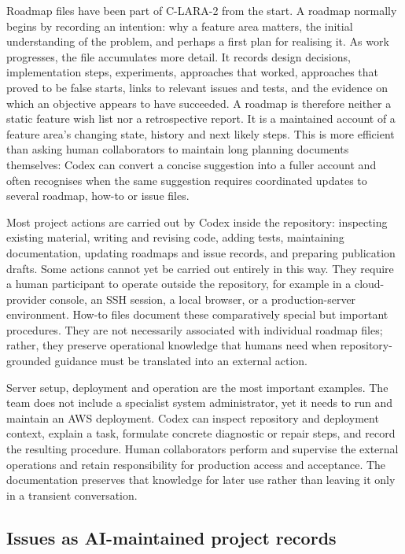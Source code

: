 Roadmap files have been part of C-LARA-2 from the start. A roadmap normally
begins by recording an intention: why a feature area matters, the initial
understanding of the problem, and perhaps a first plan for realising it. As
work progresses, the file accumulates more detail. It records design
decisions, implementation steps, experiments, approaches that worked,
approaches that proved to be false starts, links to relevant issues and tests,
and the evidence on which an objective appears to have succeeded. A roadmap
is therefore neither a static feature wish list nor a retrospective report. It
is a maintained account of a feature area's changing state, history and next
likely steps. This is more efficient than asking human collaborators to
maintain long planning documents themselves: Codex can convert a concise
suggestion into a fuller account and often recognises when the same suggestion
requires coordinated updates to several roadmap, how-to or issue files.

Most project actions are carried out by Codex inside the repository:
inspecting existing material, writing and revising code, adding tests,
maintaining documentation, updating roadmaps and issue records, and preparing
publication drafts. Some actions cannot yet be carried out entirely in this
way. They require a human participant to operate outside the repository, for
example in a cloud-provider console, an SSH session, a local browser, or a
production-server environment. How-to files document these comparatively
special but important procedures. They are not necessarily associated with
individual roadmap files; rather, they preserve operational knowledge that
humans need when repository-grounded guidance must be translated into an
external action.

Server setup, deployment and operation are the most important examples. The
team does not include a specialist system administrator, yet it needs to run
and maintain an AWS deployment. Codex can inspect repository and deployment
context, explain a task, formulate concrete diagnostic or repair steps, and
record the resulting procedure. Human collaborators perform and supervise the
external operations and retain responsibility for production access and
acceptance. The documentation preserves that knowledge for later use rather
than leaving it only in a transient conversation.

\subsection{Issues as AI-maintained project records}

